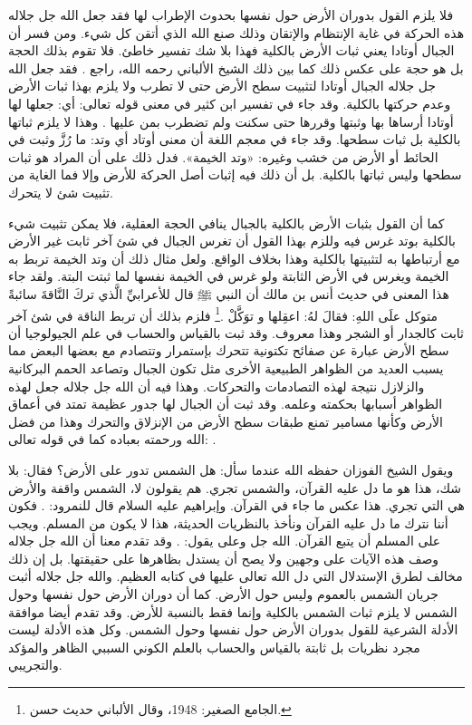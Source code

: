 فلا يلزم القول بدوران الأرض حول نفسها بحدوث الإطراب لها فقد جعل الله جل جلاله هذه الحركة في غاية الإنتظام والإتقان وذلك صنع الله الذي أتقن كل شيء. ومن فسر أن الجبال أوتادا يعني ثبات الأرض بالكلية فهذا بلا شك تفسير خاطئ. فلا تقوم بذلك الحجة بل هو حجة على عكس ذلك كما بين ذلك الشيخ الألباني رحمه الله، راجع . فقد جعل الله جل جلاله الجبال أوتادا لتثبيت سطح الأرض حتى لا تطرب ولا يلزم بهذا ثبات الأرض وعدم حركتها بالكلية. وقد جاء في تفسير ابن كثير في معنى قوله تعالى: \quranayah*[78][6-7]{\footnotesize \surahname*[78]} أي: جعلها لها أوتادا أرساها بها وثبتها وقررها حتى سكنت ولم تضطرب بمن عليها \cite{tafsir_ibnKathir}. وهذا لا يلزم ثباتها بالكلية بل ثبات سطحها. وقد جاء في معجم اللغة أن معنى أوتاد أي وتد: ما رُزَّ وثبت في الحائط أو الأرض من خشب وغيره: «وتد الخيمة». فدل ذلك على أن المراد هو ثبات سطحها وليس ثباتها بالكلية. بل أن ذلك فيه إثبات أصل الحركة للأرض وإلا فما الغاية من تثبيت شئ لا يتحرك. 

كما أن القول بثبات الأرض بالكلية بالجبال ينافي الحجة العقلية، فلا يمكن تثبيت شيء بالكلية بوتد غرس فيه وللزم بهذا القول أن تغرس الجبال في شئ آخر ثابت غير الأرض مع أرتباطها به لتثبيتها بالكلية وهذا بخلاف الواقع. ولعل مثال ذلك أن وتد الخيمة تربط به الخيمة ويغرس في الأرض الثابتة ولو غرس في الخيمة نفسها لما ثبتت البتة. ولقد جاء هذا المعنى في حديث أنس بن مالك أن النبي ﷺ قال للأعرابيِّ الَّذي تركَ النَّاقةَ سائبةً متوكل علَى اللهِ: فقالَ لهُ: اعقِلها و توَكَّلْ \href{https://shamela.ws/book/21659/1948#p1}{\faExternalLink} \cite{jamaaSagheer}.\footnote{الجامع الصغير: 1948، وقال الألباني حديث حسن.} فلزم بذلك أن تربط الناقة في شئ آخر ثابت كالجدار أو الشجر وهذا معروف. وقد ثبت بالقياس والحساب في علم الجيولوجيا أن سطح الأرض عبارة عن صفائح تكتونية تتحرك بإستمرار وتتصادم مع بعضها البعض مما يسبب العديد من الظواهر الطبيعية الأخرى مثل تكون الجبال وتصاعد الحمم البركانية والزلازل نتيجة لهذه التصادمات والتحركات. وهذا فيه أن الله جل جلاله جعل لهذه الظواهر أسبابها بحكمته وعلمه. وقد ثبت أن الجبال لها جدور عظيمة تمتد في أعماق الأرض وكأنها مسامير تمنع طبقات سطح الأرض من الإنزلاق والتحرك وهذا من فضل الله ورحمته بعباده كما في قوله تعالى: \quranayah*[16][15]{\footnotesize \surahname*[16]}.

ويقول الشيخ الفوزان حفظه الله عندما سأل: هل الشمس تدور على الأرض؟ فقال: بلا شك، هذا هو ما دل عليه القرآن، والشمس تجري. هم يقولون لا، الشمس واقفة والأرض هي التي تجري. هذا عكس ما جاء في القرآن. وإبراهيم عليه السلام قال للنمرود: \quranayah*[2][258][26-38] {\footnotesize (\surahname*[2])}. فكون أننا نترك ما دل عليه القرآن ونأخذ بالنظريات الحديثة، هذا لا يكون من المسلم. ويجب على المسلم أن يتبع القرآن. الله جل وعلى يقول: 
\quranayah*[18][51] {\footnotesize (\surahname*[18])} \href{https://www.youtube.com/watch?v=32PPmN-Tq9g}{\faExternalLink}. وقد تقدم معنا أن الله جل جلاله وصف هذه الآيات على وجهين ولا يصح أن يستدل بظاهرها على حقيقتها. بل إن ذلك مخالف لطرق الإستدلال التي دل الله تعالى عليها في كتابه العظيم. والله جل جلاله أثبت جريان الشمس بالعموم وليس حول الأرض. كما أن دوران الأرض حول نفسها وحول الشمس لا يلزم ثبات الشمس بالكلية وإنما فقط بالنسبة للأرض. وقد تقدم أيضا موافقة الأدلة الشرعية للقول بدوران الأرض حول نفسها وحول الشمس. وكل هذه الأدلة ليست مجرد نظريات بل ثابتة بالقياس والحساب بالعلم الكوني السببي الظاهر والمؤكد والتجريبي. 


